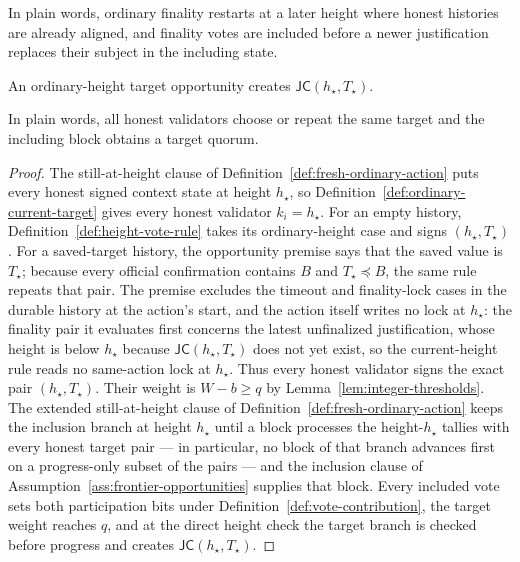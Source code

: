 \begin{assumption}
In plain words, ordinary finality restarts at a later height where honest
histories are already aligned, and finality votes are included before a
newer justification replaces their subject in the including state.
\end{assumption}

\begin{lemma}
\label{lem:fresh-ordinary-justify}
An ordinary-height target opportunity creates
\(\mathsf{JC}(h_\star,T_\star)\).

In plain words, all honest validators choose or repeat the same target and
the including block obtains a target quorum.
\end{lemma}

\begin{proof}
The still-at-height clause of
Definition~\ref{def:fresh-ordinary-action} puts every honest signed
context state at height \(h_\star\), so Definition~\ref{def:ordinary-current-target}
gives every honest validator \(k_i=h_\star\).  For an empty history,
Definition~\ref{def:height-vote-rule} takes its ordinary-height case and
signs \((h_\star,T_\star)\).  For a saved-target history, the opportunity
premise says that the saved value is \(T_\star\); because every official
confirmation contains \(B\) and \(T_\star\preceq B\), the same rule repeats
that pair.  The premise excludes the timeout and finality-lock cases
in the durable history at the action's start, and the action itself
writes no lock at \(h_\star\): the finality pair it evaluates first
concerns the latest unfinalized justification, whose height is below
\(h_\star\) because \(\mathsf{JC}(h_\star,T_\star)\) does not
yet exist, so the current-height rule reads no same-action lock at
\(h_\star\).
Thus every honest validator signs the exact pair
\((h_\star,T_\star)\).  Their weight is \(W-b\geq q\) by
Lemma~\ref{lem:integer-thresholds}.  The extended still-at-height clause
of Definition~\ref{def:fresh-ordinary-action} keeps the inclusion branch
at height \(h_\star\) until a block processes the height-\(h_\star\)
tallies with every honest target pair --- in particular, no block of that
branch advances first on a progress-only subset of the pairs --- and the
inclusion clause of
Assumption~\ref{ass:frontier-opportunities} supplies that block.  Every
included vote sets both
participation bits under Definition~\ref{def:vote-contribution}, the
target weight reaches \(q\), and at the
direct height check the target branch is checked before
progress and creates
\(\mathsf{JC}(h_\star,T_\star)\).
\end{proof}

